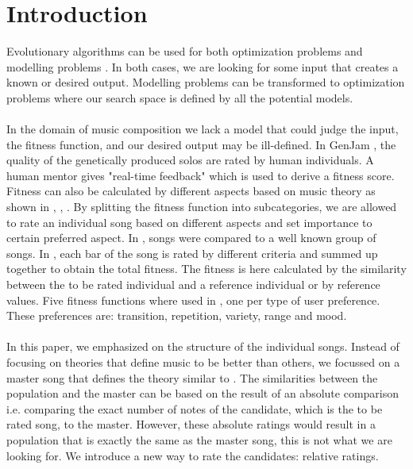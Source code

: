 \section{Introduction}
Evolutionary algorithms can be used for both optimization problems and modelling problems \cite{BOOK:GA}. In both cases, we are looking for some input that creates a known or desired output. Modelling problems can be transformed to optimization problems where our search space is defined by all the potential models. %
\\\\
In the domain of music composition we lack a model that could judge the input, the fitness function, and our desired output may be ill-defined. In GenJam \cite{PAPER:GENJAM}, the quality of the genetically produced solos are rated by human individuals. A human mentor gives "real-time feedback" which is used to derive a fitness score. Fitness can also be calculated by different  aspects based on music theory as shown in \cite{PAPER:DRAGAN}, \cite{PAPER:GUPEA}, \cite{PAPER:MAGMA}. By splitting the fitness function into subcategories, we are allowed to rate an individual song based on different aspects and set importance to certain preferred aspect. In \cite{PAPER:GUPEA}, songs were compared to a well known group of songs. In \cite{PAPER:DRAGAN}, each bar of the song is rated by different criteria and summed up together to obtain the total fitness. The fitness is here calculated by the similarity between the to be rated individual and a reference individual or by reference values.  Five fitness functions where used in \cite{PAPER:MAGMA}, one per type of user preference. These preferences are: transition, repetition, variety, range and mood.
\\\\
In this paper, we emphasized on the structure of the individual songs. Instead of focusing on theories that define music to be better than others, we focussed on a master song that defines the theory similar to \cite{PAPER:DRAGAN}. The similarities between the population and the master can be based on the result of an absolute comparison i.e. comparing the exact number of notes of the candidate, which is the to be rated song, to the master. However, these absolute ratings would result in a population that is exactly the same as the master song, this is not what we are looking for. We introduce a new way to rate the candidates: relative ratings.




